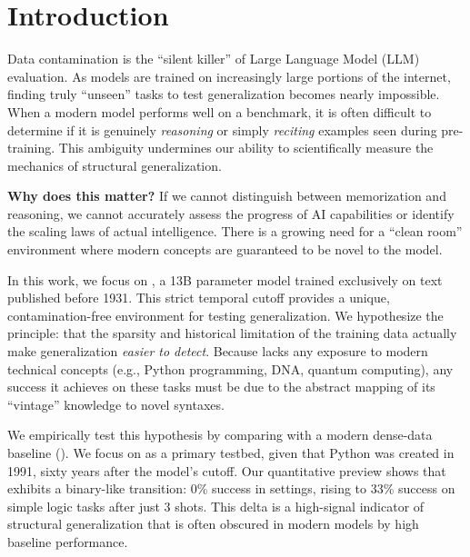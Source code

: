 \section{Introduction}
\label{sec:intro}

Data contamination is the ``silent killer'' of Large Language Model (LLM) evaluation. As models are trained on increasingly large portions of the internet, finding truly ``unseen'' tasks to test generalization becomes nearly impossible. When a modern model performs well on a benchmark, it is often difficult to determine if it is genuinely \textit{reasoning} or simply \textit{reciting} examples seen during pre-training. This ambiguity undermines our ability to scientifically measure the mechanics of structural generalization.

{\bf Why does this matter?} If we cannot distinguish between memorization and reasoning, we cannot accurately assess the progress of AI capabilities or identify the scaling laws of actual intelligence. There is a growing need for a ``clean room'' environment where modern concepts are guaranteed to be novel to the model.

In this work, we focus on \talkie \cite{radford2026talkie}, a 13B parameter model trained exclusively on text published before 1931. This strict temporal cutoff provides a unique, contamination-free environment for testing generalization. We hypothesize the \hypo principle: that the sparsity and historical limitation of the training data actually make generalization \textit{easier to detect}. Because \talkie lacks any exposure to modern technical concepts (e.g., Python programming, DNA, quantum computing), any success it achieves on these tasks must be due to the abstract mapping of its ``vintage'' knowledge to novel syntaxes.

We empirically test this hypothesis by comparing \talkie with a modern dense-data baseline (\talkieweb). We focus on \humaneval \cite{radford2026talkie} as a primary testbed, given that Python was created in 1991, sixty years after the model's cutoff. Our quantitative preview shows that \talkie exhibits a binary-like transition: 0\% success in \zeroshot settings, rising to 33\% success on simple logic tasks after just 3 shots. This delta is a high-signal indicator of structural generalization that is often obscured in modern models by high baseline performance.

